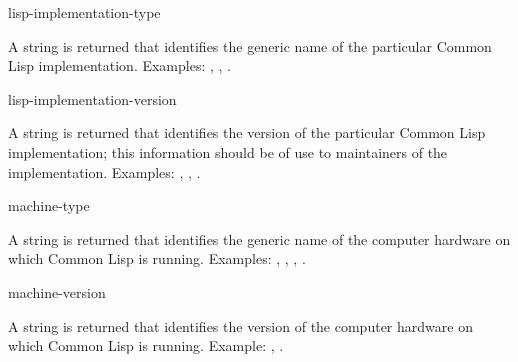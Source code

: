 
\begin{defun}[Function]
lisp-implementation-type 

A string is returned that identifies the generic name of
the particular Common Lisp implementation.
Examples: , , .

\end{defun}

\begin{defun}[Function]
lisp-implementation-version 

A string is returned that identifies the version of
the particular Common Lisp implementation; this information
should be of use to maintainers of the implementation.
Examples: , ,
.

\end{defun}

\begin{defun}[Function]
machine-type 

A string is returned that identifies the generic name of
the computer hardware on which Common Lisp is running.
Examples: , , , .

\end{defun}

\begin{defun}[Function]
machine-version 

A string is returned that identifies the version of
the computer hardware on which Common Lisp is running.
Example: , .

\end{defun}

